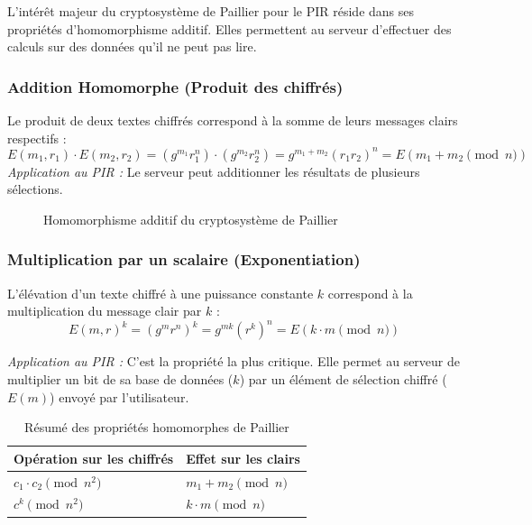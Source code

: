 \documentclass[12pt,a4paper]{report}
\begin{document}
L'intérêt majeur du cryptosystème de Paillier pour le PIR réside dans ses propriétés d'homomorphisme additif. Elles permettent au serveur d'effectuer des calculs sur des données qu'il ne peut pas lire.

\subsubsection{Addition Homomorphe (Produit des chiffrés)}


Le produit de deux textes chiffrés correspond à la somme de leurs messages clairs respectifs :
\[ E(m_1, r_1) \cdot E(m_2, r_2) = (g^{m_1}r_1^n) \cdot (g^{m_2}r_2^n) = g^{m_1+m_2}(r_1r_2)^n = E(m_1 + m_2 \pmod n) \]
\textit{Application au PIR :} Le serveur peut additionner les résultats de plusieurs sélections.

\begin{figure}[h]
\centering
{}

\caption{Homomorphisme additif du cryptosystème de Paillier}
\end{figure}

\subsubsection{Multiplication par un scalaire (Exponentiation)}


L'élévation d'un texte chiffré à une puissance constante $k$ correspond à la multiplication du message clair par $k$ :
\[ E(m, r)^k = (g^m r^n)^k = g^{mk}(r^k)^n = E(k \cdot m \pmod n) \]

\textit{Application au PIR :} C'est la propriété la plus critique. Elle permet au serveur de multiplier un bit de sa base de données ($k$) par un élément de sélection chiffré ($E(m)$) envoyé par l'utilisateur.

\begin{table}[h]
\centering
\begin{tabular}{|l|l|}
\hline
\textbf{Opération sur les chiffrés} & \textbf{Effet sur les clairs} \\ \hline
$c_1 \cdot c_2 \pmod{n^2}$ & $m_1 + m_2 \pmod n$ \\ \hline
$c^k \pmod{n^2}$ & $k \cdot m \pmod n$ \\ \hline
\end{tabular}
\caption{Résumé des propriétés homomorphes de Paillier}
\end{table}
\end{document}

